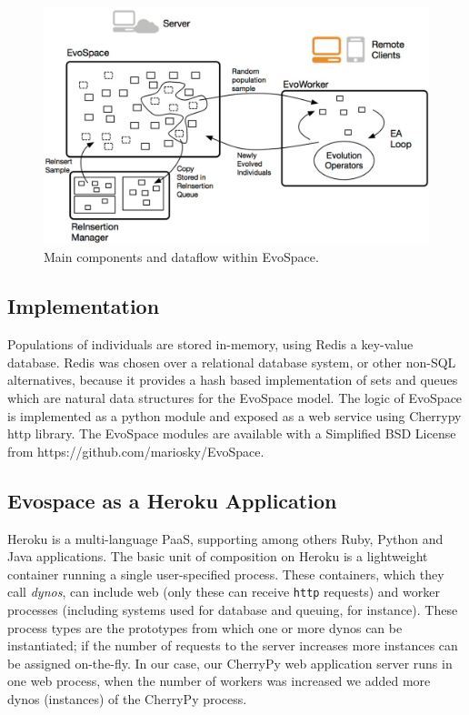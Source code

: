 \documentclass{llncs}
\begin{document}
\begin{figure}[t]
    \centering
        \includegraphics[width=4.5in]{eps/evospaceExample.eps}
    \caption{Main components and dataflow within EvoSpace.}
    \label{fig:evo}
\end{figure}


\subsection{Implementation}
Populations of individuals are stored in-memory, using Redis a key-value database.
Redis was chosen over a relational database system, or other non-SQL 
alternatives, because it provides a hash based implementation of sets 
and queues which are natural data structures for the EvoSpace model. 
The logic of EvoSpace is implemented as a python module and exposed as a web 
service using Cherrypy http library. The EvoSpace modules are available with 
a Simplified BSD License from https://github.com/mariosky/EvoSpace. 

\subsection{Evospace as a Heroku Application}
Heroku is a multi-language PaaS, supporting among others
Ruby, Python and Java applications. The basic unit of composition on
Heroku is a lightweight container running a single user-specified
process. These containers, which they call {\em dynos}, can include web
(only these can receive {\tt http} requests) and worker processes
(including systems used for database and queuing, for instance).
These  process types are the prototypes from which one or more dynos 
can be instantiated; if the number of requests to the server increases
more instances can be assigned on-the-fly. In our case, our CherryPy 
web application server runs in one web process, when the number 
of workers was increased we added more dynos (instances) of the 
CherryPy process.
\end{document}
